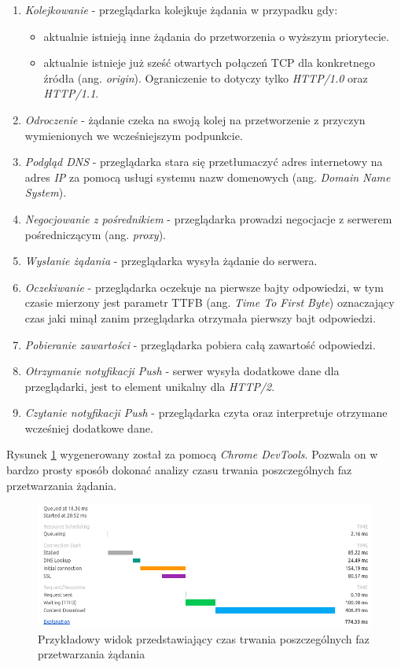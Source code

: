 \documentclass[polish, twoside, 12pt]{mwart}
\begin{document}
\begin{enumerate}
  \item \emph{Kolejkowanie} - przeglądarka kolejkuje żądania w przypadku gdy:
    \begin{itemize}
      \item aktualnie istnieją inne żądania do przetworzenia o wyższym priorytecie.
      \item aktualnie istnieje już sześć otwartych połączeń TCP dla konkretnego źródła (ang. \emph{origin}). Ograniczenie to dotyczy tylko \emph{HTTP/1.0} oraz \emph{HTTP/1.1}.
    \end{itemize}
  \item \emph{Odroczenie} - żądanie czeka na swoją kolej na przetworzenie z przyczyn wymienionych we wcześniejszym podpunkcie.
  \item \emph{Podgląd DNS} - przeglądarka stara się przetłumaczyć adres internetowy na adres \emph{IP} za pomocą usługi systemu nazw domenowych (ang. \emph{Domain Name System}).
  \item \emph{Negocjowanie z pośrednikiem} - przeglądarka prowadzi negocjacje z serwerem pośredniczącym (ang. \emph{proxy}).
  \item \emph{Wysłanie żądania} - przeglądarka wysyła żądanie do serwera.
  \item \emph{Oczekiwanie} - przeglądarka oczekuje na pierwsze bajty odpowiedzi, w tym czasie mierzony jest parametr TTFB (ang. \emph{Time To First Byte}) oznaczający czas jaki minął zanim przeglądarka otrzymała pierwszy bajt odpowiedzi.
  \item \emph{Pobieranie zawartości} - przeglądarka pobiera całą zawartość odpowiedzi.
  \item \emph{Otrzymanie notyfikacji Push} - serwer wysyła dodatkowe dane dla przeglądarki, jest to element unikalny dla \emph{HTTP/2}.
  \item \emph{Czytanie notyfikacji Push} - przeglądarka czyta oraz interpretuje otrzymane wcześniej dodatkowe dane.
\end{enumerate}

Rysunek \ref{fig:request-timing-chrome} wygenerowany został za pomocą \emph{Chrome DevTools}. Pozwala on w bardzo prosty sposób dokonać analizy czasu trwania poszczególnych faz przetwarzania żądania.

\begin{figure}[ht]
  \includegraphics[width=\textwidth]{request-timing-chrome.png}
  \caption{Przykładowy widok przedstawiający czas trwania poszczególnych faz przetwarzania żądania}
  \label{fig:request-timing-chrome}
\end{figure}
\end{document}
